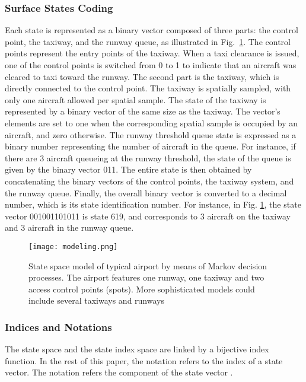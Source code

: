\documentclass[letterpaper]{article}
\begin{document}
\subsubsection{Surface States Coding}
Each state is represented as a binary vector composed of three parts: the control point, the taxiway, and the runway queue, as illustrated 
in Fig.~\ref{modeling}. The control points represent the entry points of the taxiway. When a taxi clearance is issued, 
one of the control points is switched from 0 to 1 to indicate that an aircraft was cleared to taxi toward the runway. 
The second part is the taxiway, which is directly connected to the control point. The taxiway is spatially sampled, 
with only one aircraft allowed per spatial sample. The state of the taxiway is represented by a binary vector of the same size as the taxiway. The vector's elements are set to one when the corresponding spatial sample is occupied by an aircraft, and zero otherwise. 
The runway threshold queue state
is expressed as a binary number representing the number of aircraft in the queue. For instance, if there are 3 aircraft queueing at the runway threshold, the state of the queue is given by the binary vector 011.
The entire state is then obtained by concatenating the binary vectors of the control points, the taxiway system, and the runway queue.
Finally, the overall binary vector is converted to a decimal number, 
which is its state identification number. For instance, in Fig. \ref{modeling}, the state vector 001001101011 is state 619, 
and corresponds to 3 aircraft on the taxiway and 3 aircraft in the runway queue.\\
\begin{figure}[ht]
\centering
\texttt{[image: modeling.png]}
\caption{State space model of typical airport by means of Markov decision processes. The airport features one runway, one taxiway and two access control points (spots). 
More sophisticated models could include several taxiways and runways} \label{modeling}
\end{figure}

\subsubsection{Indices and Notations}

The state space and the state index space are linked by a bijective index function.
In the rest of this paper, the notation  refers to the index of a state vector.
The notation  refers the  component of the state vector .
\end{document}
